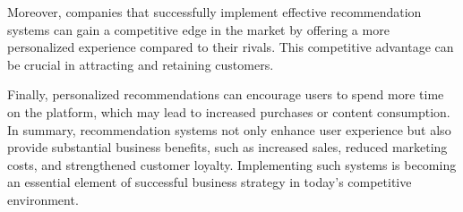 \documentclass[10pt,twoside,slovak,a4paper]{article}
\begin{document}
Moreover, companies that successfully implement effective recommendation systems can gain a competitive edge in the market by offering a more personalized experience compared to their rivals\cite{comerce}. This competitive advantage can be crucial in attracting and retaining customers.

Finally, personalized recommendations can encourage users to spend more time on the platform\cite{experience}, which may lead to increased purchases or content consumption. In summary, recommendation systems not only enhance user experience but also provide substantial business benefits, such as increased sales, reduced marketing costs, and strengthened customer loyalty. Implementing such systems is becoming an essential element of successful business strategy in today’s competitive environment.
\end{document}
